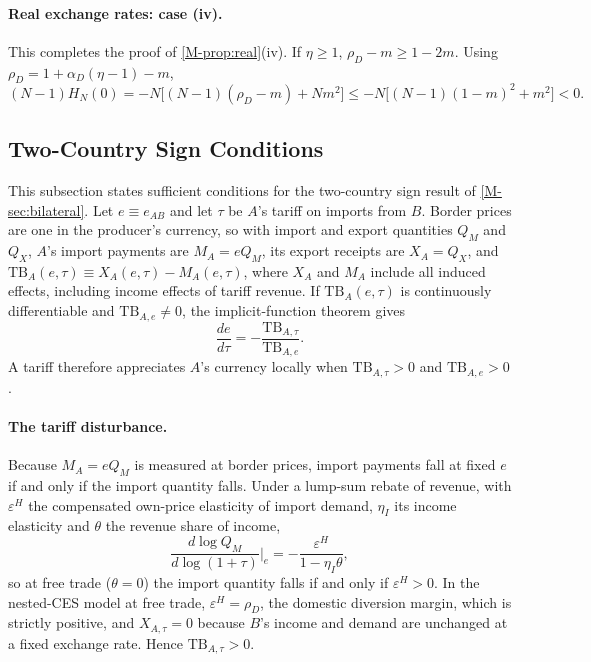 \documentclass[11pt]{article}
\numberwithin{equation}{section}
\theoremstyle{plain}
\newcommand{\TB}{\mathrm{TB}}
\begin{document}
\paragraph{Real exchange rates: case (iv).} This completes the proof of \cref{M-prop:real}(iv). If $\eta\geq1$, $\rho_D-m\geq1-2m$. Using $\rho_D=1+\alpha_D(\eta-1)-m$,
\begin{equation*}
(N-1)H_N(0)=-N\big[(N-1)(\rho_D-m)+Nm^2\big]\leq-N\big[(N-1)(1-m)^2+m^2\big]<0.
\end{equation*}

\subsection{Two-Country Sign Conditions}
\label{sup:twocountry}

This subsection states sufficient conditions for the two-country sign result of \cref{M-sec:bilateral}. Let $e\equiv e_{AB}$ and let $\tau$ be $A$'s tariff on imports from $B$. Border prices are one in the producer's currency, so with import and export quantities $Q_M$ and $Q_X$, $A$'s import payments are $M_A=eQ_M$, its export receipts are $X_A=Q_X$, and $\TB_A(e,\tau)\equiv X_A(e,\tau)-M_A(e,\tau)$, where $X_A$ and $M_A$ include all induced effects, including income effects of tariff revenue. If $\TB_A(e,\tau)$ is continuously differentiable and $\TB_{A,e}\neq0$, the implicit-function theorem gives
\begin{equation*}
\frac{de}{d\tau}=-\frac{\TB_{A,\tau}}{\TB_{A,e}}.
\end{equation*}
A tariff therefore appreciates $A$'s currency locally when $\TB_{A,\tau}>0$ and $\TB_{A,e}>0$.

\paragraph{The tariff disturbance.} Because $M_A=eQ_M$ is measured at border prices, import payments fall at fixed $e$ if and only if the import quantity falls. Under a lump-sum rebate of revenue, with $\varepsilon^H$ the compensated own-price elasticity of import demand, $\eta_I$ its income elasticity and $\theta$ the revenue share of income,
\begin{equation*}
\frac{d\log Q_M}{d\log(1+\tau)}\bigg|_e=-\frac{\varepsilon^H}{1-\eta_I\theta},
\end{equation*}
so at free trade ($\theta=0$) the import quantity falls if and only if $\varepsilon^H>0$. In the nested-CES model at free trade, $\varepsilon^H=\rho_D$, the domestic diversion margin, which is strictly positive, and $X_{A,\tau}=0$ because $B$'s income and demand are unchanged at a fixed exchange rate. Hence $\TB_{A,\tau}>0$.
\end{document}
